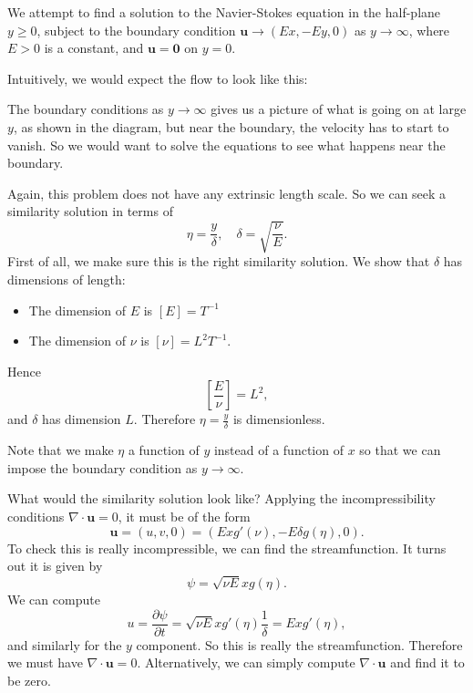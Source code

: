 \documentclass[a4paper]{article}
\begin{document}
\begin{eg}
  We attempt to find a solution to the Navier-Stokes equation in the half-plane $y \geq 0$, subject to the boundary condition $\mathbf{u} \to (Ex, -E y, 0)$ as $y \to \infty$, where $E > 0$ is a constant, and $\mathbf{u} = \mathbf{0}$ on $y = 0$.

  Intuitively, we would expect the flow to look like this:
  \begin{center}
  \end{center}
  The boundary conditions as $y \to \infty$ gives us a picture of what is going on at large $y$, as shown in the diagram, but near the boundary, the velocity has to start to vanish. So we would want to solve the equations to see what happens near the boundary.

  Again, this problem does not have any extrinsic length scale. So we can seek a similarity solution in terms of
  \[
    \eta = \frac{y}{\delta}, \quad \delta = \sqrt{\frac{\nu}{E}}.
  \]
  First of all, we make sure this is the right similarity solution. We show that $\delta$ has dimensions of length:
  \begin{itemize}
    \item The dimension of $E$ is $[E] = T^{-1}$
    \item The dimension of $\nu$ is $[\nu] = L^2 T^{-1}$.
  \end{itemize}
  Hence
  \[
    \left[\frac{E}{\nu}\right] = L^2,
  \]
  and $\delta$ has dimension $L$. Therefore $\eta = \frac{y}{\delta}$ is dimensionless.

  Note that we make $\eta$ a function of $y$ instead of a function of $x$ so that we can impose the boundary condition as $y \to \infty$.

  What would the similarity solution look like? Applying the incompressibility conditions $\nabla \cdot \mathbf{u} = 0$, it must be of the form
  \[
    \mathbf{u} = (u, v, 0) = (Ex g'(\nu), -E \delta g(\eta), 0).
  \]
  To check this is really incompressible, we can find the streamfunction. It turns out it is given by
  \[
    \psi = \sqrt{\nu E} x g(\eta).
  \]
  We can compute
  \[
    u = \frac{\partial \psi}{\partial t} = \sqrt{\nu E} x g'(\eta) \frac{1}{\delta} = Ex g'(\eta),
  \]
  and similarly for the $y$ component. So this is really the streamfunction. Therefore we must have $\nabla \cdot \mathbf{u} = 0$. Alternatively, we can simply compute $\nabla \cdot \mathbf{u}$ and find it to be zero.


\end{eg}
\end{document}
